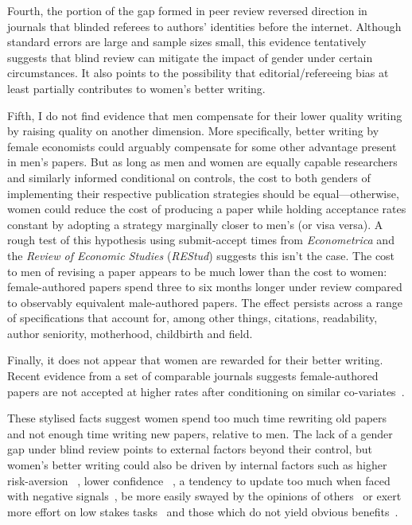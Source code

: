 Fourth, the portion of the gap formed in peer review reversed direction in journals that blinded referees to authors' identities before the internet. Although standard errors are large and sample sizes small, this evidence tentatively suggests that blind review can mitigate the impact of gender under certain circumstances. It also points to the possibility that editorial\slash refereeing bias at least partially contributes to women's better writing.

Fifth, I do not find evidence that men compensate for their lower quality writing by raising quality on another dimension. More specifically, better writing by female economists could arguably compensate for some other advantage present in men's papers. But as long as men and women are equally capable researchers and similarly informed conditional on controls, the cost to both genders of implementing their respective publication strategies should be equal---otherwise, women could reduce the cost of producing a paper while holding acceptance rates constant by adopting a strategy marginally closer to men's (or visa versa). A rough test of this hypothesis using submit-accept times from \emph{Econometrica} and the \emph{Review of Economic Studies} (\emph{REStud}) suggests this isn't the case. The cost to men of revising a paper appears to be much lower than the cost to women: female-authored papers spend three to six months longer under review compared to observably equivalent male-authored papers. The effect persists across a range of specifications that account for, among other things, citations, readability, author seniority, motherhood, childbirth and field.

Finally, it does not appear that women are rewarded for their better writing. Recent evidence from a set of comparable journals suggests female-authored papers are not accepted at higher rates after conditioning on similar co-variates~\citep{Card2020}.

These stylised facts suggest women spend too much time rewriting old papers and not enough time writing new papers, relative to men. The lack of a gender gap under blind review points to external factors beyond their control, but women's better writing could also be driven by internal factors such as higher risk-aversion ~\citep[for a review, see][]{Croson2009}, lower confidence ~\citep[see, \emph{e.g.},][]{Coffman2014,Exley2019}, a tendency to update too much when faced with negative signals~\citep{Mobius2014}, be more easily swayed by the opinions of others~\citep{Born2019} or exert more effort on low stakes tasks~\citep{Schlosser2019} and those which do not yield obvious benefits~\citep{Babcock2017}.

